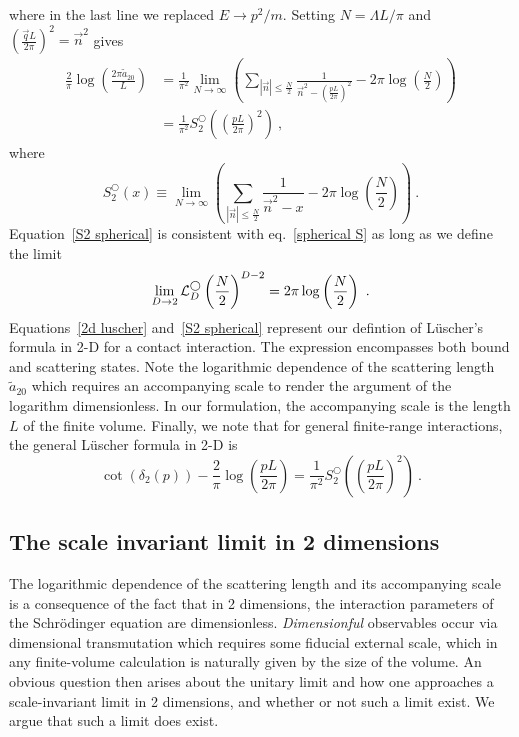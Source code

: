 where in the last line we replaced $E\to p^2/m$.  Setting $N=\Lambda L/\pi$ and $\left(\frac{\vec{q}L}{2\pi}\right)^2=\vec{n}^2$ gives
\begin{align}
\frac{2}{\pi} \log \left(\frac{2\pi \tilde a_{20}}{L}\right)&=\frac{1}{\pi^2}\lim_{N\to\infty}\left( \sum_{|\vec{n}|\le \frac{N}{2}} \frac{1}{\vec{n}^2-\left(\frac{pL}{2\pi}\right)^2}-2\pi \log \left(\frac{N}{2}\right)\right)\nonumber\\
&=\frac{1}{\pi^2}S^\bigcirc_2\left(\left(\frac{pL}{2\pi}\right)^2\right)\ ,\label{eq:2d luscher}
\end{align}
where
\begin{equation}\label{eq:S2 spherical}
S^\bigcirc_2\left(x\right)\equiv\lim_{N\to\infty}\left( \sum_{|\vec{n}|\le \frac{N}{2}} \frac{1}{\vec{n}^2-x}-2\pi \log \left(\frac{N}{2}\right)\right)\ .
\end{equation}
Equation~\eqref{S2 spherical} is consistent with eq.~\eqref{spherical S} as long as we define the limit
\begin{equation}
\lim_{D\to2}\counterterm_D^\spherical \left(\frac{N}{2}\right)^{D-2}=2\pi \log \left(\frac{N}{2}\right)\ .
\end{equation}
Equations~\eqref{2d luscher} and~\eqref{S2 spherical} represent our defintion of L\"uscher's formula in 2-D for a contact interaction. The expression encompasses both bound and scattering states.  Note the logarithmic dependence of the scattering length $\tilde a_{20}$ which requires an accompanying scale to render the argument of the logarithm dimensionless.  In our formulation, the accompanying scale is the length $L$ of the finite volume.   Finally, we note that for general finite-range interactions, the general L\"uscher formula in 2-D is
\begin{equation}\label{eq:full 2d luescher}
\cot(\delta_2(p))-\frac{2}{\pi}\log\left(\frac{pL}{2\pi}\right) = \frac{1}{\pi^2}S^\bigcirc_2\left(\left(\frac{pL}{2\pi}\right)^2\right)\ .
\end{equation}

\subsection{The scale invariant limit in 2 dimensions}
The logarithmic dependence of the scattering length and its accompanying scale is a consequence of the fact that in 2 dimensions, the interaction parameters of the Schr\"odinger equation are dimensionless.  \emph{Dimensionful} observables occur via dimensional transmutation \cite{} which requires some fiducial external scale, which in any finite-volume calculation is naturally given by the size of the volume.  An obvious question then arises about the unitary limit and how one approaches a scale-invariant limit in 2 dimensions, and whether or not such a limit exist.  We argue that such a limit does exist.

